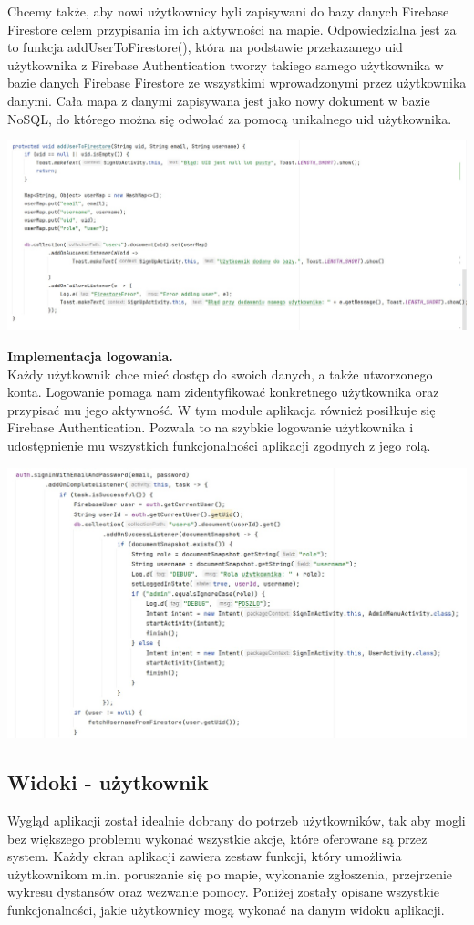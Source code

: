 Chcemy także, aby nowi użytkownicy byli zapisywani do bazy danych Firebase Firestore celem przypisania im ich aktywności na mapie. Odpowiedzialna jest za to funkcja addUserToFirestore(), która na podstawie przekazanego uid użytkownika z Firebase Authentication tworzy takiego samego użytkownika w bazie danych Firebase Firestore ze wszystkimi wprowadzonymi przez użytkownika danymi. Cała mapa z danymi zapisywana jest jako nowy dokument w bazie NoSQL, do którego można się odwołać za pomocą unikalnego uid użytkownika.\\
\noindent
\begin{minipage}{\linewidth}
    \label{lst:addtofirestore}
    \centering
    \includegraphics[width=0.6\linewidth]{img/kod/imp-addtofs.jpg}
\end{minipage}
\textbf{Implementacja logowania.}\\
\indent Każdy użytkownik chce mieć dostęp do swoich danych, a także utworzonego konta. Logowanie pomaga nam zidentyfikować konkretnego użytkownika oraz przypisać mu jego aktywność. W tym module aplikacja również posiłkuje się Firebase Authentication. Pozwala to na szybkie logowanie użytkownika i udostępnienie mu wszystkich funkcjonalności aplikacji zgodnych z jego rolą.\\
\noindent
\begin{minipage}{\linewidth}
    \label{lst:login}
    \centering
    \includegraphics[width=0.6\linewidth]{img/kod/imp-login1.jpg}
\end{minipage}


\subsection{Widoki - użytkownik}
Wygląd aplikacji został idealnie dobrany do potrzeb użytkowników, tak aby mogli bez większego problemu wykonać wszystkie akcje, które oferowane są przez system. Każdy ekran aplikacji zawiera zestaw funkcji, który umożliwia użytkownikom m.in. poruszanie się po mapie, wykonanie zgłoszenia, przejrzenie wykresu dystansów oraz wezwanie pomocy. Poniżej zostały opisane wszystkie funkcjonalności, jakie użytkownicy mogą wykonać na danym widoku aplikacji.

